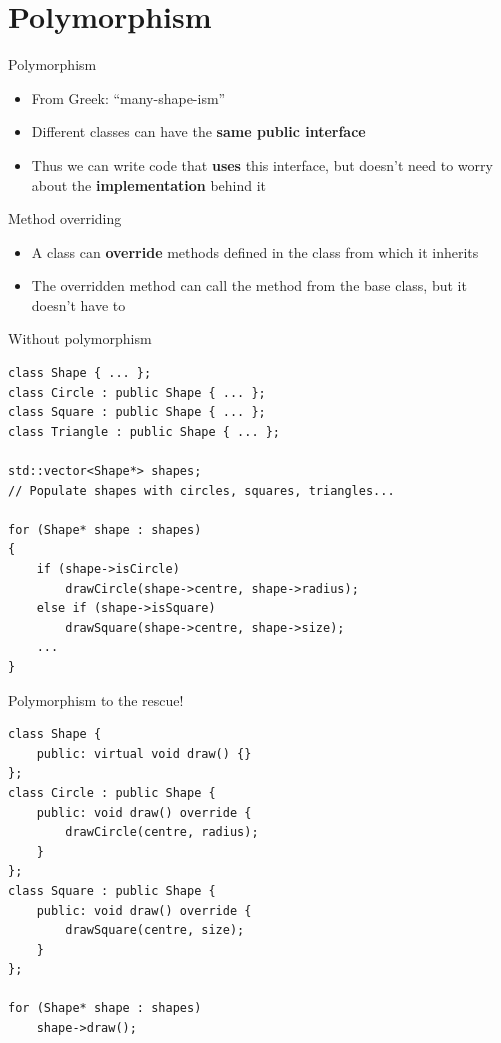 \part{Polymorphism}
\frame{\partpage}

\begin{frame}{Polymorphism}
\begin{itemize}
	\pause\item From Greek: ``many-shape-ism''
	\pause\item Different classes can have the \textbf{same public interface}
	\pause\item Thus we can write code that \textbf{uses} this interface, but doesn't need to worry about the \textbf{implementation} behind it
\end{itemize}
\end{frame}

\begin{frame}{Method overriding}
\begin{itemize}
	\pause\item A class can \textbf{override} methods defined in the class from which it inherits
	\pause\item The overridden method can call the method from the base class, but it doesn't have to
\end{itemize}
\end{frame}

\begin{frame}[fragile]{Without polymorphism}
	\begin{lstlisting}
class Shape { ... };
class Circle : public Shape { ... };
class Square : public Shape { ... };
class Triangle : public Shape { ... };

std::vector<Shape*> shapes;
// Populate shapes with circles, squares, triangles...

for (Shape* shape : shapes)
{
	if (shape->isCircle)
		drawCircle(shape->centre, shape->radius);
	else if (shape->isSquare)
		drawSquare(shape->centre, shape->size);
	...
}
	\end{lstlisting}
\end{frame}

\begin{frame}[fragile]{Polymorphism to the rescue!}
	\begin{lstlisting}
class Shape {
	public: virtual void draw() {}
};
class Circle : public Shape {
	public: void draw() override {
		drawCircle(centre, radius);
	}
};
class Square : public Shape {
	public: void draw() override {
		drawSquare(centre, size);
	}
};

for (Shape* shape : shapes)
	shape->draw();
	\end{lstlisting}
\end{frame}

